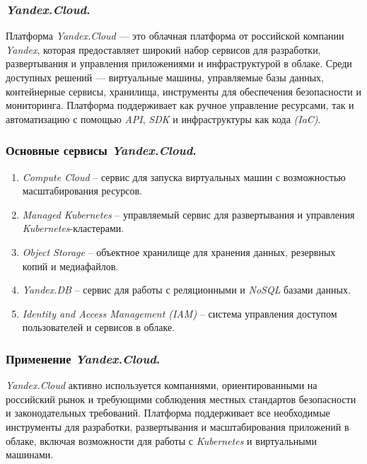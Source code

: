 \subsubsection{\textit{Yandex.Cloud}.}
\label{sec:yandex_cloud}
Платформа \textit{Yandex.Cloud} — это облачная платформа от российской компании \textit{Yandex}, которая предоставляет широкий набор сервисов для разработки, развертывания и управления приложениями и инфраструктурой в облаке.
Среди доступных решений — виртуальные машины, управляемые базы данных, контейнерные сервисы, хранилища, инструменты для обеспечения безопасности и мониторинга.
Платформа поддерживает как ручное управление ресурсами, так и автоматизацию с помощью \textit{API}, \textit{SDK} и инфраструктуры как кода \textit{(IaC)}.

\subsubsection{Основные сервисы \textit{Yandex.Cloud}.}
\begin{enumerate}
    \item \textit{Compute Cloud} -- сервис для запуска виртуальных машин с возможностью масштабирования ресурсов.
    \item \textit{Managed Kubernetes} -- управляемый сервис для развертывания и управления \textit{Kubernetes}-кластерами.
    \item \textit{Object Storage} -- объектное хранилище для хранения данных, резервных копий и медиафайлов.
    \item \textit{Yandex.DB} -- сервис для работы с реляционными и \textit{NoSQL} базами данных.
    \item \textit{Identity and Access Management (IAM)} -- система управления доступом пользователей и сервисов в облаке.
\end{enumerate}

\subsubsection{Применение \textit{Yandex.Cloud}.}
\textit{Yandex.Cloud} активно используется компаниями, ориентированными на российский рынок и требующими соблюдения местных стандартов безопасности и законодательных требований. Платформа поддерживает все необходимые инструменты для разработки, развертывания и масштабирования приложений в облаке, включая возможности для работы с \textit{Kubernetes} и виртуальными машинами.
